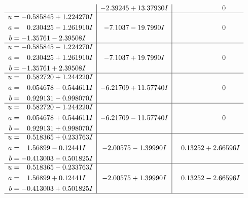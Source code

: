 \documentclass[1p]{elsarticle_modified}
\theoremstyle{definition}
\begin{document}
$$\begin{array}{c|c|c}
 & -2.39245 + 13.37930 I & \phantom{-0.000000 } 0 \\ \hline\begin{aligned}
u &= -0.585845 + 1.224270 I \\
a &= \phantom{-}0.230425 - 1.261910 I \\
b &= -1.35761 - 2.39508 I\end{aligned}
 & -7.1037 - 19.7990 I & \phantom{-0.000000 } 0 \\ \hline\begin{aligned}
u &= -0.585845 - 1.224270 I \\
a &= \phantom{-}0.230425 + 1.261910 I \\
b &= -1.35761 + 2.39508 I\end{aligned}
 & -7.1037 + 19.7990 I & \phantom{-0.000000 } 0 \\ \hline\begin{aligned}
u &= \phantom{-}0.582720 + 1.244220 I \\
a &= \phantom{-}0.054678 - 0.544611 I \\
b &= \phantom{-}0.929131 - 0.998070 I\end{aligned}
 & -6.21709 + 11.57740 I & \phantom{-0.000000 } 0 \\ \hline\begin{aligned}
u &= \phantom{-}0.582720 - 1.244220 I \\
a &= \phantom{-}0.054678 + 0.544611 I \\
b &= \phantom{-}0.929131 + 0.998070 I\end{aligned}
 & -6.21709 - 11.57740 I & \phantom{-0.000000 } 0 \\ \hline\begin{aligned}
u &= \phantom{-}0.518365 + 0.233763 I \\
a &= \phantom{-}1.56899 - 0.12441 I \\
b &= -0.413003 - 0.501825 I\end{aligned}
 & -2.00575 - 1.39990 I & \phantom{-}0.13252 + 2.66596 I \\ \hline\begin{aligned}
u &= \phantom{-}0.518365 - 0.233763 I \\
a &= \phantom{-}1.56899 + 0.12441 I \\
b &= -0.413003 + 0.501825 I\end{aligned}
 & -2.00575 + 1.39990 I & \phantom{-}0.13252 - 2.66596 I\\
 \hline 
 \end{array}$$\newpage$$\begin{array}{c|c|c}  

\end{array}$$
\end{document}
